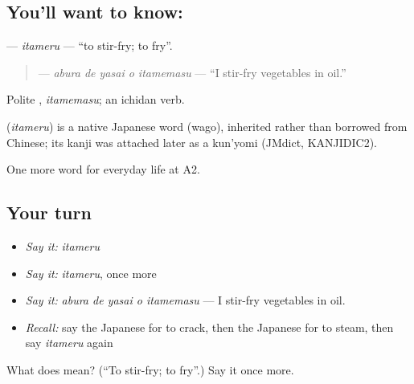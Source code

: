 \subsection*{You'll want to know: }
\textbf{} — \emph{itameru} — \textquotedblleft{}to stir-fry; to fry\textquotedblright{}.

\begin{quote}
\textbf{  } — \emph{abura de yasai o itamemasu} — \textquotedblleft{}I stir-fry vegetables in oil.\textquotedblright{}
\end{quote}

Polite \textbf{}, \emph{itamemasu}; an ichidan verb.

\begin{cousinweb}
\textbf{} (\emph{itameru}) is a native Japanese word (wago), inherited rather than borrowed from Chinese; its kanji was attached later as a kun'yomi (JMdict, KANJIDIC2).
\end{cousinweb}

\begin{grammarlens}[title={What you've built}]
One more word for everyday life at A2.
\end{grammarlens}

\subsection*{Your turn}
\begin{itemize}
\raggedright
  \item \emph{Say it:} \emph{itameru}
  \item \emph{Say it:} \emph{itameru}, once more
  \item \emph{Say it:} \emph{abura de yasai o itamemasu} — I stir-fry vegetables in oil.
  \item \emph{Recall:} say the Japanese for to crack, then the Japanese for to steam, then say \emph{itameru} again
\end{itemize}

\begin{tcolorbox}[breakable,colback=teal!4,colframe=teal!35!black,title={Before you move on}]
What does  mean? (\textquotedblleft{}To stir-fry; to fry\textquotedblright{}.) Say it once more.
\end{tcolorbox}
